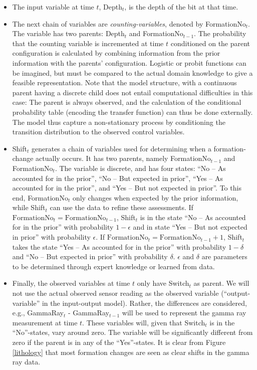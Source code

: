 \begin{itemize}

\item The input variable at time $t$, Depth$_t$, is the depth of the bit at that time.

\item The next chain of variables are \textit{counting-variables}, denoted by  FormationNo$_t$. The variable has two parents: Depth$_t$ and FormationNo$_{t-1}$. 
The probability that the counting variable is incremented at time $t$ conditioned on the parent configuration is calculated by combining information from the prior information with the parents' configuration. Logistic or probit functions can  be imagined, but must be compared to the actual domain knowledge to give a feasible representation.
Note that the model structure, with  a continuous parent having a discrete child does not entail computational difficulties in this case: The parent is always observed, and the calculation of the conditional probability table (encoding the transfer function) can thus be done externally. The model thus capture a non-stationary process by conditioning the transition distribution to the observed control variables. 

\item Shift$_t$  generates a  chain of variables used for determining when   a formation-change actually occurs. It has two parents, namely  FormationNo$_{t-1}$ and  FormationNo$_t$. 
The variable is discrete, and has four states: ``No -- As accounted for in the prior'', ``No -- But expected in prior'', ``Yes -- As accounted for in the prior'', and ``Yes -- But not expected in prior''. 
To this end, FormationNo$_t$ only changes when expected by the prior information, while Shift$_t$ can use the data to refine these assessments. If $\mbox{FormationNo}_{t}= \mbox{FormationNo}_{t-1}$, Shift$_t$ is in the state 
 ``No -- As accounted for in the prior'' with probability $1-\epsilon$ and in state ``Yes -- But not expected in prior'' with probability $\epsilon$. If $\mbox{FormationNo}_{ t}=\mbox{FormationNo}_{t-1}+1$, Shift$_t$ takes the state 
``Yes -- As accounted for in the prior'' with probability $1-\delta$ and ``No -- But expected in prior'' with probability $\delta$. $\epsilon$ and $\delta$ are parameters to be determined through expert knowledge or learned from data.

\item Finally, the observed variables at time $t$ only have  Switch$_t$ as parent. We will not use the actual observed sensor reading as the observed variable (``output-variable'' in the input-output model). Rather, the differences are considered, e.g., GammaRay$_t$ - GammaRay$_{t-1}$ will be used to represent the gamma ray measurement at time $t$. These variables will, given that Switch$_t$ is in the ``No''-states, vary around zero. The variable will be significantly different from zero if the parent is in any of the ``Yes''-states.  It is clear from Figure \ref{lithology} that most formation changes are seen as clear shifts in the gamma ray data.
\end{itemize}

